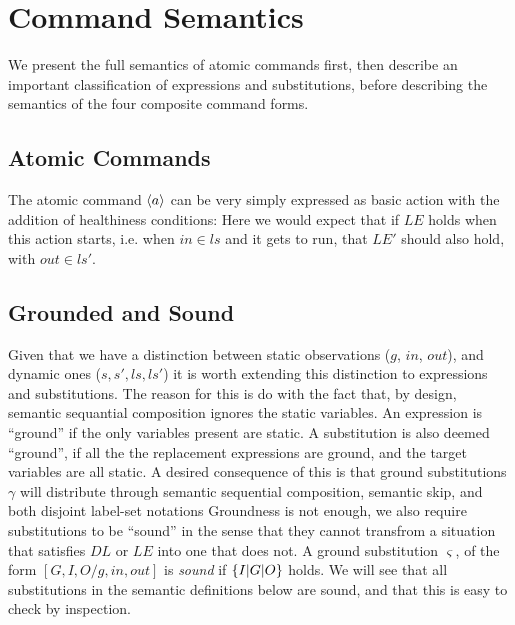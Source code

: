 \section{Command Semantics}\label{sec:semantics}

We present the full semantics of atomic commands first,
then describe an important classification of expressions and substitutions,
before describing the semantics of the four composite command forms.

\subsection{Atomic Commands}\label{ssec:atomic}

The atomic command $\langle a\rangle$ can be very simply expressed as basic action
with the addition of healthiness conditions:
Here we would expect that if $LE$ holds when this action starts,
i.e. when $in \in ls$ and it gets to run,
that $LE'$ should also hold, with $out \in ls'$.

\subsection{Grounded and Sound}

Given that we have a distinction between static observations ($g$, $in$, $out$),
and dynamic ones ($s,s',ls,ls'$) it is worth extending this distinction
to expressions and substitutions.
The reason for this is do with the fact that, by design,
semantic sequantial composition ignores the static variables.
An expression is ``ground'' if the only variables present are static.
A substitution is also deemed ``ground'',
if all the the replacement expressions are ground,
and the target variables are all static.
A desired consequence of this is that
ground substitutions $\gamma$
will distribute through semantic sequential composition,
semantic skip,
and both disjoint label-set notations
Groundness is not enough, we also require substitutions to be ``sound''
in the sense that they cannot transfrom a situation that satisfies $DL$
or $LE$ into one that does not.
A ground substitution $\varsigma$, of the form $[G,I,O/g,in,out]$ is \emph{sound}
if $\{{I|G|O}\}$ holds.
We will see that all substitutions in the semantic definitions
below are sound, and that this is easy to check by inspection.


